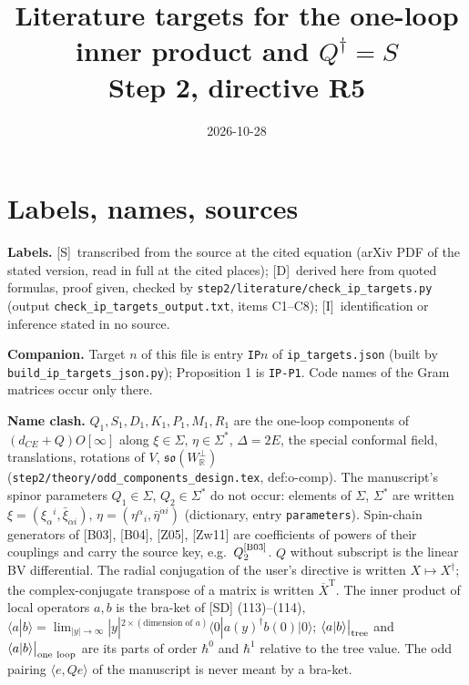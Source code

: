 \documentclass[11pt]{article}
\title{Literature targets for the one-loop inner product and $Q^\dagger=S$\\[2pt]
\large Step 2, directive R5}
\date{2026-10-28}
\theoremstyle{definition}
\newcommand{\Sl}{\textup{[S]}}
\newcommand{\Dl}{\textup{[D]}}
\newcommand{\Il}{\textup{[I]}}
\newcommand{\tree}{\big|_{\rm tree}}
\newcommand{\oneloop}{\big|_{\rm one\ loop}}
\begin{document}
\maketitle

\section{Labels, names, sources}

\textbf{Labels.} \Sl\ transcribed from the source at the cited equation (arXiv PDF of the stated version, read in full at the cited places); \Dl\ derived here from quoted formulas, proof given, checked by \texttt{step2/literature/check\_ip\_targets.py} (output \texttt{check\_ip\_targets\_output.txt}, items C1--C8); \Il\ identification or inference stated in no source.

\textbf{Companion.} Target $n$ of this file is entry \texttt{IP}$n$ of \texttt{ip\_targets.json} (built by \texttt{build\_ip\_targets\_json.py}); Proposition 1 is \texttt{IP-P1}. Code names of the Gram matrices occur only there.

\textbf{Name clash.} $Q_1,S_1,D_1,K_1,P_1,M_1,R_1$ are the one-loop components of $(d_{CE}+Q)O[\infty]$ along $\xi\in\Sigma$, $\eta\in\Sigma^*$, $\Delta=2E$, the special conformal field, translations, rotations of $V$, $\mathfrak{so}(W_{\mathbb R}^\perp)$ (\texttt{step2/theory/odd\_components\_design.tex}, def:o-comp). The manuscript's spinor parameters $Q_1\in\Sigma$, $Q_2\in\Sigma^*$ do not occur: elements of $\Sigma$, $\Sigma^*$ are written $\xi=(\xi_\alpha{}^i,\bar\xi_{\dot\alpha i})$, $\eta=(\eta^\alpha{}_i,\bar\eta^{\dot\alpha i})$ (dictionary, entry \texttt{parameters}). Spin-chain generators of [B03], [B04], [Z05], [Zw11] are coefficients of powers of their couplings and carry the source key, e.g.\ $Q_2^{\rm[B03]}$. $Q$ without subscript is the linear BV differential. The radial conjugation of the user's directive is written $X\mapsto X^\dagger$; the complex-conjugate transpose of a matrix is written $\overline{X}^{\mathrm T}$. The inner product of local operators $a,b$ is the bra-ket of [SD] (113)--(114), $\langle a|b\rangle=\lim_{|y|\to\infty}|y|^{2\times(\text{dimension of }a)}\langle 0|a(y)^\dagger b(0)|0\rangle$; $\langle a|b\rangle\tree$ and $\langle a|b\rangle\oneloop$ are its parts of order $\hbar^0$ and $\hbar^1$ relative to the tree value. The odd pairing $\langle e,Qe\rangle$ of the manuscript is never meant by a bra-ket.
\end{document}
